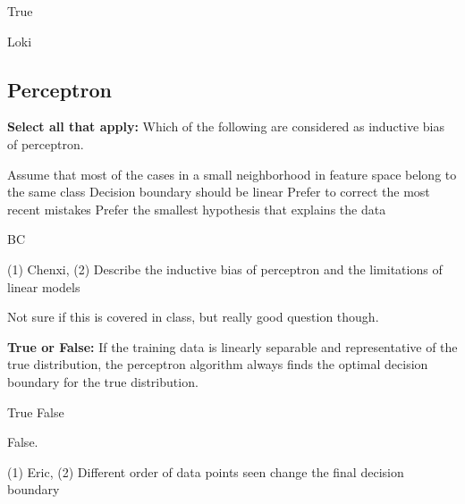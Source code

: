 \begin{questions}
    \begin{soln}
    True
    \end{soln}
    
    \begin{qauthor}
    Loki
    \end{qauthor}

\end{questions}   

\newpage
\subsection{Perceptron}
\begin{questions}
\question[1] \textbf{Select all that apply:} Which of the following are considered as inductive bias of perceptron.
    {%
    \checkboxchar{$\Box$} %
    \begin{checkboxes}
     \choice Assume that most of the cases in a small neighborhood in feature space belong to the same class
     \choice Decision boundary should be linear
     \choice Prefer to correct the most recent mistakes
     \choice Prefer the smallest hypothesis that explains the data
    \end{checkboxes}
    }
    \begin{soln}
    BC
    \end{soln}
    \begin{qauthor}
    (1) Chenxi, (2) Describe the inductive bias of perceptron and the limitations of linear models
    \end{qauthor}
    \begin{qtester}
    Not sure if this is covered in class, but really good question though.
    \end{qtester}
    
\question[1] \textbf{True or False:} If the training data is linearly separable and representative of the true distribution, the perceptron algorithm always finds the optimal decision boundary for the true distribution.
    \begin{checkboxes}
     \choice True 
     \choice False
    \end{checkboxes}
    \begin{soln}
    False.
    \end{soln}
    \begin{qauthor}
    (1) Eric, (2) Different order of data points seen change the final decision boundary
    \end{qauthor}
    
\end{questions}

